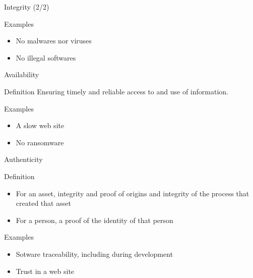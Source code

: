 \begin{reveals}
\begin{frame}[c]{Integrity (2/2)}
  \vfill

  \begin{block}{Examples}
    \begin{itemize}
    \item No malwares nor viruses
    \item No illegal softwares
    \end{itemize}
  \end{block}

\end{frame}

\begin{frame}[c]{Availability}
  
  \begin{block}{Definition}
    Ensuring timely and reliable access to and use of information.
  \end{block}

  \vfill

  \begin{block}{Examples}
    \begin{itemize}
    \item A slow web site
    \item No ransomware
    \end{itemize}
  \end{block}

\end{frame}

\begin{frame}[c]{Authenticity}
  
  \begin{block}{Definition}
    \begin{itemize}
    \item For an asset, integrity and proof of origins and integrity
      of the process that created that asset
    \item For a person, a proof of the identity of that person 
    \end{itemize}
  \end{block}

  \vfill

  \begin{block}{Examples}
    \begin{itemize}
    \item Sotware traceability, including during development
    \item Trust in a web site
    \end{itemize}
  \end{block}
\end{frame}



\end{reveals}
